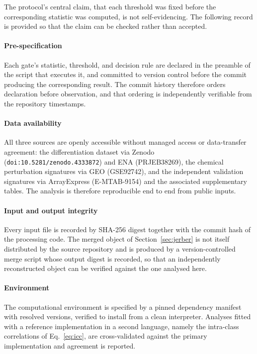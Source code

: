 \documentclass[5p,times,twocolumn]{elsarticle}
\begin{document}
The protocol's central claim, that each threshold was fixed before the
corresponding statistic was computed, is not self-evidencing. The following
record is provided so that the claim can be checked rather than accepted.

\paragraph{\textbf{Pre-specification}} Each gate's statistic, threshold, and
decision rule are declared in the preamble of the script that executes it, and
committed to version control before the commit producing the corresponding
result. The commit history therefore orders declaration before observation, and
that ordering is independently verifiable from the repository timestamps.

\paragraph{\textbf{Data availability}} All three sources are openly accessible
without managed access or data-transfer agreement: the differentiation dataset
via Zenodo (\texttt{doi:10.5281/zenodo.4333872}) and ENA (PRJEB38269), the
chemical perturbation signatures via GEO (GSE92742), and the independent
validation signatures via ArrayExpress (E-MTAB-9154) and the associated
supplementary tables. The analysis is therefore reproducible end to end from
public inputs.

\paragraph{\textbf{Input and output integrity}} Every input file is recorded by
SHA-256 digest together with the commit hash of the processing code. The merged
object of Section~\ref{sec:jerber} is not itself distributed by the source
repository and is produced by a version-controlled merge script whose output
digest is recorded, so that an independently reconstructed object can be
verified against the one analysed here.

\paragraph{\textbf{Environment}} The computational environment is specified by a
pinned dependency manifest with resolved versions, verified to install from a
clean interpreter. Analyses fitted with a reference implementation in a second
language, namely the intra-class correlations of Eq.~\eqref{eq:icc}, are
cross-validated against the primary implementation and agreement is reported.
\end{document}

